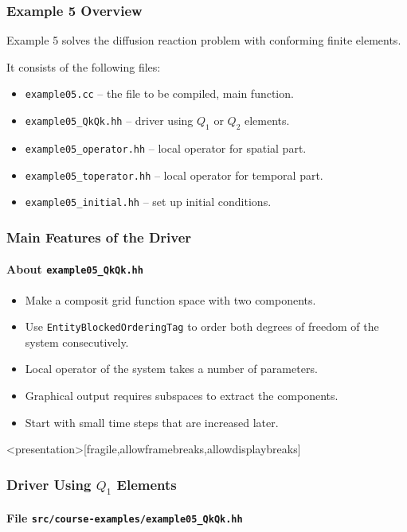 \begin{frame}
\frametitle{Example 5 Overview}
Example 5 solves the diffusion reaction problem with conforming finite elements.

It consists of the following files:
\begin{itemize}
\item \lstinline{example05.cc} -- the file to be compiled, main function. 
\item \lstinline{example05_QkQk.hh} -- driver using $Q_1$ or $Q_2$ elements. 
\item \lstinline{example05_operator.hh} -- local operator for spatial part.
\item \lstinline{example05_toperator.hh} -- local operator for temporal part.
\item \lstinline{example05_initial.hh} -- set up initial conditions.
\end{itemize}
\end{frame}

\begin{frame}
\frametitle{Main Features of the Driver}
\framesubtitle{About \lstinline{example05_QkQk.hh}}
\begin{itemize}
\item Make a composit grid function space with two components.
\item Use \lstinline{EntityBlockedOrderingTag} to order
both degrees of freedom of the system consecutively.
\item Local operator of the system takes a number of parameters.
\item Graphical output requires subspaces to extract the components.
\item Start with small time steps that are increased later.
\end{itemize}
\end{frame}

\begin{frame}<presentation>[fragile,allowframebreaks,allowdisplaybreaks]
\frametitle<presentation>{Driver Using $Q_1$ Elements}
\framesubtitle<presentation>{File \texttt{src/course-examples/example05\_QkQk.hh}}

\end{frame}

